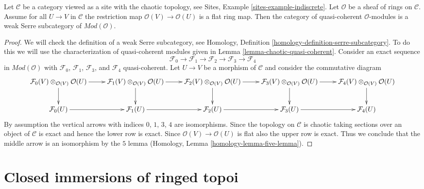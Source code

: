 \begin{lemma}
\label{lemma-chaotic-flat-quasi-coherent}
Let $\mathcal{C}$ be a category viewed as a site with the chaotic
topology, see Sites, Example \ref{sites-example-indiscrete}.
Let $\mathcal{O}$ be a sheaf of rings on $\mathcal{C}$.
Assume for all $U \to V$ in $\mathcal{C}$ the restriction map
$\mathcal{O}(V) \to \mathcal{O}(U)$ is a flat ring map.
Then the category of quasi-coherent $\mathcal{O}$-modules is
a weak Serre subcategory of $\textit{Mod}(\mathcal{O})$.
\end{lemma}

\begin{proof}
We will check the definition of a weak Serre subcategory, see
Homology, Definition \ref{homology-definition-serre-subcategory}.
To do this we will use the characterization of quasi-coherent modules given in
Lemma \ref{lemma-chaotic-quasi-coherent}.
Consider an exact sequence
$$
\mathcal{F}_0 \to \mathcal{F}_1 \to
\mathcal{F}_2 \to \mathcal{F}_3 \to
\mathcal{F}_4
$$
in $\textit{Mod}(\mathcal{O})$ with $\mathcal{F}_0$, $\mathcal{F}_1$,
$\mathcal{F}_3$, and $\mathcal{F}_4$ quasi-coherent. Let $U \to V$
be a morphism of $\mathcal{C}$ and consider the commutative diagram
$$
\xymatrix{
\mathcal{F}_0(V) \otimes_{\mathcal{O}(V)} \mathcal{O}(U) \ar[r] \ar[d] &
\mathcal{F}_1(V) \otimes_{\mathcal{O}(V)} \mathcal{O}(U) \ar[r] \ar[d] &
\mathcal{F}_2(V) \otimes_{\mathcal{O}(V)} \mathcal{O}(U) \ar[r] \ar[d] &
\mathcal{F}_3(V) \otimes_{\mathcal{O}(V)} \mathcal{O}(U) \ar[r] \ar[d] &
\mathcal{F}_4(V) \otimes_{\mathcal{O}(V)} \mathcal{O}(U) \ar[d] \\
\mathcal{F}_0(U) \ar[r] &
\mathcal{F}_1(U) \ar[r] &
\mathcal{F}_2(U) \ar[r] &
\mathcal{F}_3(U) \ar[r] &
\mathcal{F}_4(U)
}
$$
By assumption the vertical arrows with indices $0$, $1$, $3$, $4$
are isomorphisms. Since the topology on $\mathcal{C}$ is chaotic
taking sections over an object of $\mathcal{C}$ is exact and hence
the lower row is exact. Since $\mathcal{O}(V) \to \mathcal{O}(U)$
is flat also the upper row is exact. Thus we conclude that the middle
arrow is an isomorphism by the $5$ lemma
(Homology, Lemma \ref{homology-lemma-five-lemma}).
\end{proof}






\section{Closed immersions of ringed topoi}
\label{section-closed-immersion}

